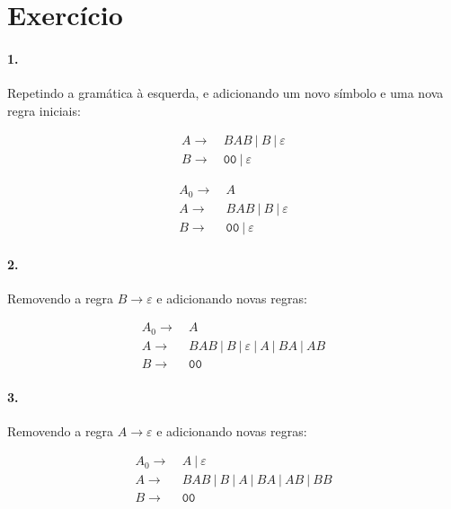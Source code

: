\documentclass[a4paper, 12pt]{article}
\newcommand{\rom}[1]{\uppercase\expandafter{\romannumeral #1\relax}}
\begin{document}
\newpage
\section*{Exercício \rom{5}} \label{sec:ex5}

\paragraph{1.}

Repetindo a gramática à esquerda, e adicionando
um novo símbolo e uma nova regra iniciais:

\begin{minipage}[t]{0.5\textwidth}
    \begin{align*}
        A \rightarrow & \: BAB \: | \: B \: | \: \varepsilon \\
        B \rightarrow & \: \texttt{00} \: | \: \varepsilon
    \end{align*}
\end{minipage}
\begin{minipage}[t]{0.5\textwidth}
    \begin{align*}
        A_0 \rightarrow & \: A \\
        A \rightarrow & \: BAB \: | \: B \: | \: \varepsilon \\
        B \rightarrow & \: \texttt{00} \: | \: \varepsilon
    \end{align*}
\end{minipage}

\paragraph{2.}

Removendo a regra $B \rightarrow \varepsilon$ e adicionando
novas regras:

\begin{align*}
    A_0 \rightarrow & \: A \\
    A \rightarrow & \: BAB \: | \: B \: | \: \varepsilon \: | \: A \: | \: BA \: | \: AB \\
    B \rightarrow & \: \texttt{00}
\end{align*}

\paragraph{3.}

Removendo a regra $A \rightarrow \varepsilon$ e adicionando
novas regras:

\begin{align*}
    A_0 \rightarrow & \: A \: | \: \varepsilon \\
    A \rightarrow & \: BAB \: | \: B \: | \: A \: | \: BA \: | \: AB \: | \: BB  \\
    B \rightarrow & \: \texttt{00}
\end{align*}
\end{document}
